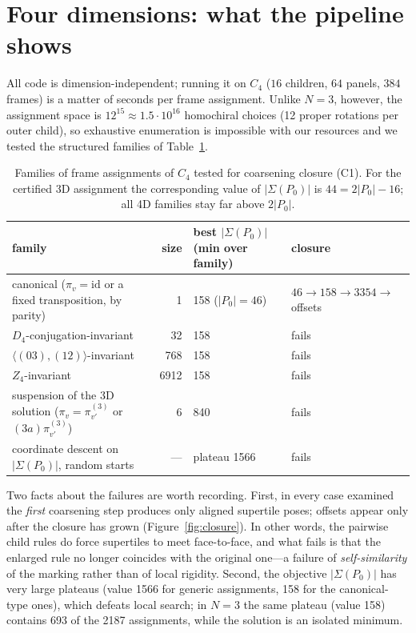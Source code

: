 \documentclass[11pt,a4paper]{article}
\theoremstyle{plain}
\theoremstyle{definition}
\begin{document}
\section{Four dimensions: what the pipeline shows}\label{sec:N4}

All code is dimension-independent; running it on $C_4$ ($16$ children, $64$ panels, $384$ frames) is a matter of seconds per frame assignment. Unlike $N = 3$, however, the assignment space is $12^15 \approx 1.5 \cdot 10^16$ homochiral choices (12 proper rotations per outer child), so exhaustive enumeration is impossible with our resources and we tested the structured families of Table~\ref{tab:N4}.

\begin{table}[t]\centering\small
\begin{tabular}{p{5.2cm}rp{3.2cm}p{4cm}}\toprule
\textbf{family} & \textbf{size} & \textbf{best $|\Sigma(P_0)|$ (min over family)} & \textbf{closure} \\ \midrule
canonical ($\pi_v = \mathrm{\mathrm{id}}$ or a fixed transposition, by parity) & 1 & 158 ($|P_0| = 46$) & $46 \to 158 \to 3354 \to$ offsets \\
$D_4$-conjugation-invariant & 32 & 158 & fails \\
$\langle (0 3), (1 2) \rangle$-invariant & 768 & 158 & fails \\
$Z_4$-invariant & 6912 & 158 & fails \\
suspension of the 3D solution ($\pi_v = \pi^{(3)}_{v'}$ or $(3 a) \pi^{(3)}_{v'}$) & 6 & 840 & fails \\
coordinate descent on $|\Sigma(P_0)|$, random starts & --- & plateau 1566 & fails \\
\bottomrule\end{tabular}
\caption{Families of frame assignments of $C_4$ tested for coarsening closure (C1). For the certified 3D assignment the corresponding value of $|\Sigma(P_0)|$ is $44 = 2|P_0| - 16$; all 4D families stay far above $2|P_0|$.}\label{tab:N4}\end{table}

Two facts about the failures are worth recording. First, in every case examined the \emph{first} coarsening step produces only aligned supertile poses; offsets appear only after the closure has grown (Figure~\ref{fig:closure}). In other words, the pairwise child rules do force supertiles to meet face-to-face, and what fails is that the enlarged rule no longer coincides with the original one---a failure of \emph{self-similarity} of the marking rather than of local rigidity. Second, the objective $|\Sigma(P_0)|$ has very large plateaus (value 1566 for generic assignments, 158 for the canonical-type ones), which defeats local search; in $N = 3$ the same plateau (value 158) contains 693 of the 2187 assignments, while the solution is an isolated minimum.
\end{document}
